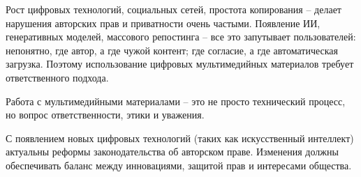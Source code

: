 \documentclass{ou}
\begin{document}
Рост цифровых технологий, социальных сетей, простота копирования -- делает нарушения авторских прав и приватности очень частыми. Появление ИИ, генеративных моделей, массового репостинга -- все это запутывает пользователей: непонятно, где автор, а где чужой контент; где согласие, а где автоматическая загрузка. Поэтому использование цифровых мультимедийных материалов требует ответственного подхода.

Работа с мультимедийными материалами -- это не просто технический процесс, но вопрос ответственности, этики и уважения. 

С появлением новых цифровых технологий (таких как искусственный интеллект) актуальны реформы законодательства об авторском праве. Изменения должны обеспечивать баланс между инновациями, защитой прав и интересами общества.
\newpage
{
\sloppy
\nocite{*}
\cleardoublepage
{}


}
\end{document}
